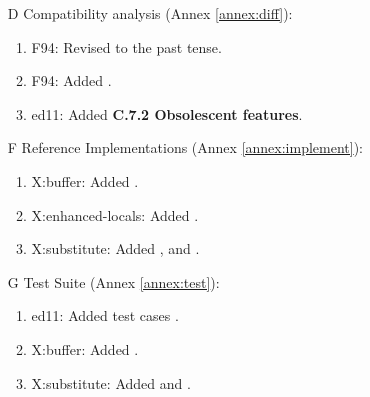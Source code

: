 \begin{itemize}
	\item[D] Compatibility analysis 				(Annex \ref{annex:diff}):
		\begin{enumerate}
		\item \textsf{F94}: Revised  to the past tense.
		\item \textsf{F94}: Added .
		\item \textsf{ed11}: Added \textbf{C.7.2 Obsolescent features}.
		\end{enumerate}

	\item[F] Reference Implementations			(Annex \ref{annex:implement}):
		\begin{enumerate}
		\item \textsf{X:buffer}: Added .
		\item \textsf{X:enhanced-locals}: Added .
		\item \textsf{X:substitute}: Added
			,
			 and
			.
		\end{enumerate}

	\item[G] Test Suite								(Annex \ref{annex:test}):
		\begin{enumerate}
		\item \textsf{ed11}: Added test cases .
		\item \textsf{X:buffer}: Added .
		\item \textsf{X:substitute}: Added
			 and
			.
		\end{enumerate}
	\end{itemize}


